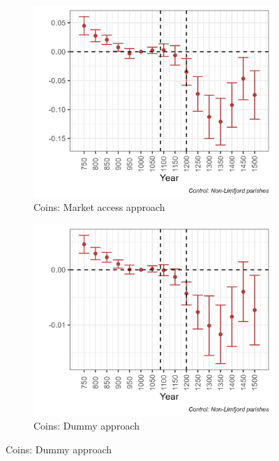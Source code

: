 \begin{figure}[h!]
    \centering
    \caption{Archaelogical results (full sample)}
    \begin{subfigure}[b]{0.45\textwidth}
        \centering
        \caption{\label{fig:arch1a} Coins: Market access approach}
        \includegraphics[width=\textwidth]{Plots/Regression_plots/arch_MA_coins_norm.png}
    \end{subfigure}
    \hfill
    \begin{subfigure}[b]{0.45\textwidth}
        \centering
        \caption{\label{fig:arch1b} Coins: Dummy approach}
        \includegraphics[width=\textwidth]{Plots/Regression_plots/arch_dummy_coins_norm.png}

\end{subfigure}
\end{figure}
